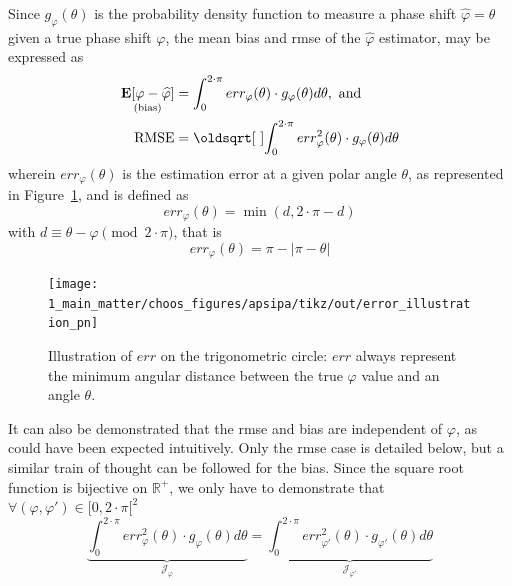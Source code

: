 Since $g_\varphi(\theta)$ is the probability density function to measure a phase shift $\widehat{\varphi}=\theta$ given a true phase shift $\varphi$, the mean bias and \gls{rmse} of the $\widehat{\varphi}$ estimator, may be expressed as
\begin{equation}\label{eq:choos:apsipa:rmse_def}
	\begin{aligned}
		\underset{\mathrm{(bias)}}{\esp{\left[\varphi - \widehat{\varphi}\right]}} &= \int_{0}^{2\cdot \pi} err_\varphi(\theta) \cdot g_\varphi(\theta) d\theta,\ \mathrm{and} \\
		\text{RMSE} &= \sqrt{\int_{0}^{2\cdot \pi} err_\varphi^2(\theta) \cdot g_\varphi(\theta) d\theta}
	\end{aligned}
\end{equation}
wherein $err_\varphi(\theta)$ is the estimation error at a given polar angle $\theta$, as represented in Figure~\ref{fig:choos:apsipa:error_illustration}, and is defined as
\begin{equation}
	err_\varphi(\theta) = \min \left(d, 2\cdot \pi - d\right)
\end{equation}
with $d \equiv \theta - \varphi \pmod{2\cdot\pi}$, that is
\begin{equation}
	err_\varphi(\theta) = \pi - |\pi - \theta|
\end{equation}

\begin{figure}
	\centering
	\texttt{[image: 1\_main\_matter/choos\_figures/apsipa/tikz/out/error\_illustration\_pn]}
	\caption{Illustration of $err$ on the trigonometric circle: $err$ always represent the minimum angular distance between the true $\varphi$ value and an angle $\theta$.}
	\label{fig:choos:apsipa:error_illustration}
\end{figure}

It can also be demonstrated that the \gls{rmse} and bias are independent of $\varphi$, as could have been expected intuitively. Only the \gls{rmse} case is detailed below, but a similar train of thought can be followed for the bias. Since the square root function is bijective on $\mathbb{R}^+$, we only have to demonstrate that $\forall (\varphi,\varphi') \in [0, 2 \cdot \pi[^2$
\begin{equation}
	\underbrace{\int_{0}^{2\cdot \pi} err_\varphi^2(\theta) \cdot g_\varphi(\theta) d\theta}_{\mathcal{J_\varphi}} = \underbrace{\int_{0}^{2\cdot \pi} err_{\varphi'}^2(\theta) \cdot g_{\varphi'}(\theta) d\theta}_{\mathcal{J_{\varphi'}}}
\end{equation}

